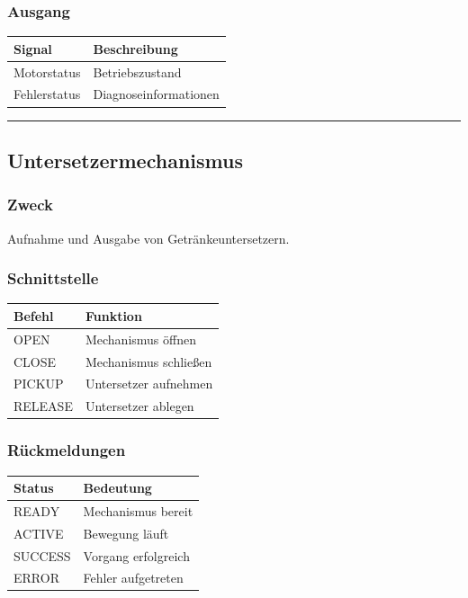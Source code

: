\documentclass[
]{article}
\begin{document}
\subsubsection{Ausgang}\label{ausgang}

\begin{longtable}[]{@{}ll@{}}
\toprule\noalign{}
Signal & Beschreibung \\
\midrule\noalign{}
\endhead
\bottomrule\noalign{}
\endlastfoot
Motorstatus & Betriebszustand \\
Fehlerstatus & Diagnoseinformationen \\
\end{longtable}

\begin{center}\rule{0.5\linewidth}{0.5pt}\end{center}

\subsection{Untersetzermechanismus}\label{untersetzermechanismus-1}

\subsubsection{Zweck}\label{zweck-4}

Aufnahme und Ausgabe von Getränkeuntersetzern.

\subsubsection{Schnittstelle}\label{schnittstelle-4}

\begin{longtable}[]{@{}ll@{}}
\toprule\noalign{}
Befehl & Funktion \\
\midrule\noalign{}
\endhead
\bottomrule\noalign{}
\endlastfoot
OPEN & Mechanismus öffnen \\
CLOSE & Mechanismus schließen \\
PICKUP & Untersetzer aufnehmen \\
RELEASE & Untersetzer ablegen \\
\end{longtable}

\subsubsection{Rückmeldungen}\label{ruxfcckmeldungen}

\begin{longtable}[]{@{}ll@{}}
\toprule\noalign{}
Status & Bedeutung \\
\midrule\noalign{}
\endhead
\bottomrule\noalign{}
\endlastfoot
READY & Mechanismus bereit \\
ACTIVE & Bewegung läuft \\
SUCCESS & Vorgang erfolgreich \\
ERROR & Fehler aufgetreten \\
\end{longtable}
\end{document}
